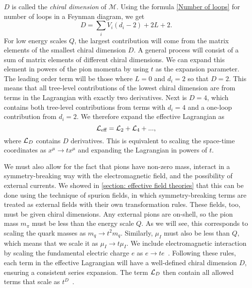 $D$ is called the \emph{chiral dimension} of $\mathcal M$.
Using the formula \autoref{Number of loops} for number of loops in a Feynman diagram, we get
\begin{equation}
    D = \sum_i V_i(d_i - 2) + 2 L + 2.
\end{equation}
%
For low energy scales $Q$, the largest contribution will come from the matrix elements of the smallest chiral dimension $D$.
A general process will consist of a sum of matrix elements of different chiral dimensions.
We can expand this element in powers of the pion momenta by using $t$ as the expansion parameter.
The leading order term will be those where $L = 0$ and $d_i = 2$ so that $D = 2$.
This means that all tree-level contributions of the lowest chiral dimension are from terms in the Lagrangian with exactly two derivatives.
Next is $D = 4$, which contains both tree-level contributions from terms with $d_i = 4$ and a one-loop contribution from $d_i = 2$.
We therefore expand the effective Lagrangian as
\begin{equation}
    \mathcal{L}_\text{eff} = \mathcal{L}_2 + \mathcal{L}_4 + ...,
\end{equation}
%
where $\mathcal{L}_{D}$ contains $D$ derivatives.
This is equivalent to scaling the space-time coordinates as $x^\mu \rightarrow tx^\mu$ and expanding the Lagrangian in powers of $t$.

We must also allow for the fact that pions have non-zero mass, interact in a symmetry-breaking way with the electromagnetic field, and the possibility of external currents.
We showed in \autoref{section: effective field theories} that this can be done using the technique of spurion fields, in which symmetry-breaking terms are treated as external fields with their own transformation rules.
These fields, too, must be given chiral dimensions.
Any external pions are on-shell, so the pion mass $m_\pi$ must be less than the energy scale $Q$.
As we will see, this corresponds to scaling the quark masses as $m_q \rightarrow t^2 m_q$.
Similarly, $\mu_I$ must also be less than $Q$, which means that we scale it as $\mu_I\rightarrow t \mu_I$.
We include electromagnetic interaction by scaling the fundamental electric charge $e$ as $e\rightarrow te$~\autocite{urechVirtualPhotonsChiral1995}.
Following these rules, each term in the effective Lagrangian will have a well-defined chiral dimension $D$, ensuring a consistent series expansion.
The term $\mathcal{L}_{D}$ then contain all allowed terms that scale as $t^D$~\autocite{schererIntroductionChiralPerturbation2002,weinbergPhenomenologicalLagrangians1979a,weinbergQuantumTheoryFields1996}.

